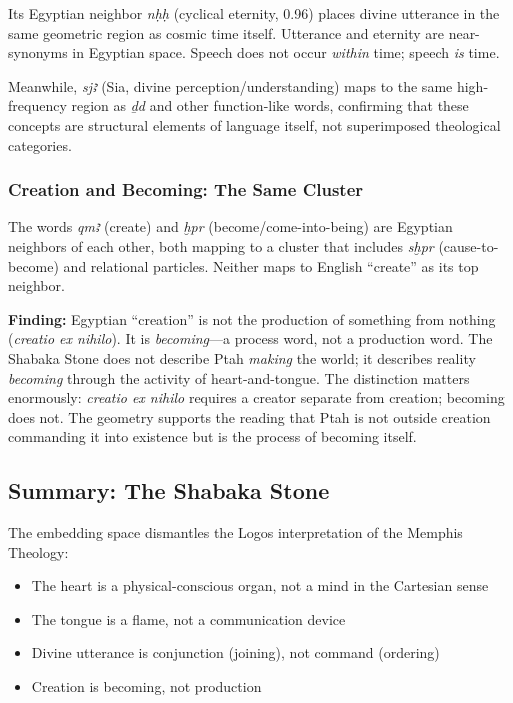 \documentclass[11pt, a4paper]{article}
\begin{document}
Its Egyptian neighbor \textit{nḥḥ} (cyclical eternity, 0.96) places divine utterance in the same geometric region as cosmic time itself. Utterance and eternity are near-synonyms in Egyptian space. Speech does not occur \textit{within} time; speech \textit{is} time.

Meanwhile, \textit{sjꜣ} (Sia, divine perception/understanding) maps to the same high-frequency region as \textit{ḏd} and other function-like words, confirming that these concepts are structural elements of language itself, not superimposed theological categories.

\subsubsection{Creation and Becoming: The Same Cluster}

The words \textit{qmꜣ} (create) and \textit{ḫpr} (become/come-into-being) are Egyptian neighbors of each other, both mapping to a cluster that includes \textit{sḫpr} (cause-to-become) and relational particles. Neither maps to English ``create'' as its top neighbor.

{\color{insight}\textbf{Finding:}} Egyptian ``creation'' is not the production of something from nothing (\textit{creatio ex nihilo}). It is \textit{becoming}---a process word, not a production word. The Shabaka Stone does not describe Ptah \textit{making} the world; it describes reality \textit{becoming} through the activity of heart-and-tongue. The distinction matters enormously: \textit{creatio ex nihilo} requires a creator separate from creation; becoming does not. The geometry supports the reading that Ptah is not outside creation commanding it into existence but is the process of becoming itself.

\subsection{Summary: The Shabaka Stone}

The embedding space dismantles the Logos interpretation of the Memphis Theology:

\begin{itemize}[nosep]
    \item The heart is a physical-conscious organ, not a mind in the Cartesian sense
    \item The tongue is a flame, not a communication device
    \item Divine utterance is conjunction (joining), not command (ordering)
    \item Creation is becoming, not production
\end{itemize}
\end{document}
